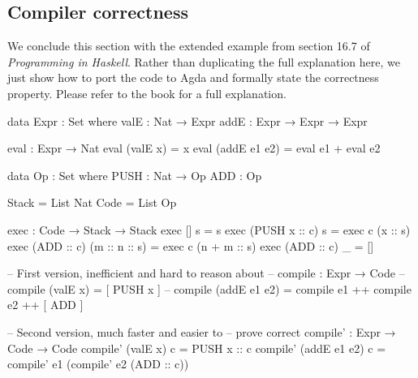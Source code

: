 \documentclass[a4paper,UKenglish]{tufte-handout}
\theoremstyle{definition}
\begin{document}
\subsection{Compiler correctness}

We conclude this section with the extended example from section 16.7
of \emph{Programming in Haskell}. Rather than duplicating the full
explanation here, we just show how to port the code to Agda and
formally state the correctness property. Please refer to the book for
a full explanation.

\begin{AgdaAlign}
\begin{AgdaSuppressSpace}
\begin{code}[number]
data Expr : Set where
  valE  : Nat → Expr
  addE  : Expr → Expr → Expr

\end{code}

\begin{code}[number]
eval : Expr → Nat
eval (valE x)      = x
eval (addE e1 e2)  = eval e1 + eval e2

\end{code}

\begin{code}[number]
data Op : Set where
  PUSH  : Nat → Op
  ADD   : Op

\end{code}

\begin{code}[number]
Stack  = List Nat
Code   = List Op

\end{code}

\begin{code}[number]
exec : Code → Stack → Stack
exec []             s              = s
exec (PUSH x :: c)  s              = exec c (x :: s)
exec (ADD    :: c)  (m :: n :: s)  = exec c (n + m :: s)
exec (ADD    :: c)  _              = []

\end{code}

\begin{code}[number]
-- First version, inefficient and hard to reason about
-- compile : Expr → Code
-- compile (valE x)     = [ PUSH x ]
-- compile (addE e1 e2) = compile e1 ++ compile e2 ++ [ ADD ]

-- Second version, much faster and easier to
-- prove correct
compile' : Expr → Code → Code
compile' (valE x)      c  = PUSH x :: c
compile' (addE e1 e2)  c  = compile' e1 (compile' e2 (ADD :: c))


\end{code}
\end{AgdaSuppressSpace}
\end{AgdaAlign}
\end{document}
